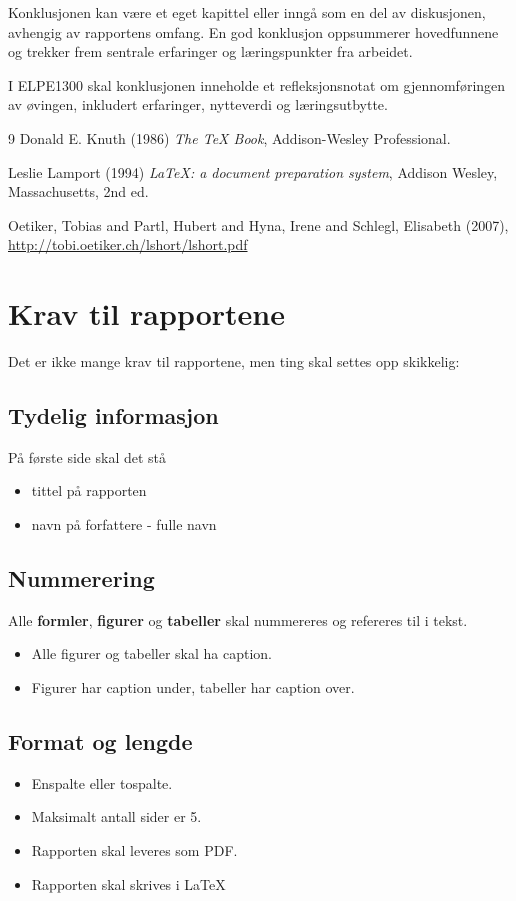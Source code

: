 \documentclass[11pt,a4paper,twocolumn]{article}
\begin{document}
Konklusjonen kan være et eget kapittel eller inngå som en del av diskusjonen, avhengig av rapportens omfang. En god konklusjon oppsummerer hovedfunnene og trekker frem sentrale erfaringer og læringspunkter fra arbeidet.


I ELPE1300 skal konklusjonen inneholde et refleksjonsnotat om gjennomføringen av øvingen, inkludert erfaringer, nytteverdi og læringsutbytte.



\begin{thebibliography}{9}
Donald E. Knuth (1986) \emph{The \TeX{} Book}, Addison-Wesley Professional.

Leslie Lamport (1994) \emph{\LaTeX: a document preparation system}, Addison
Wesley, Massachusetts, 2nd ed.

{Oetiker, Tobias and Partl, Hubert and Hyna, Irene and Schlegl, Elisabeth} (2007), \url{http://tobi.oetiker.ch/lshort/lshort.pdf}

\end{thebibliography}

\newpage
\appendix
\section{Krav til rapportene}\label{app:krav}
Det er ikke mange krav til rapportene, men ting skal settes opp skikkelig:
\subsection{Tydelig informasjon}
På første side skal det stå
  \begin{itemize}
    \item tittel på rapporten
    \item navn på forfattere - fulle navn
  \end{itemize} 
\subsection{Nummerering}
Alle \textbf{formler}, \textbf{figurer} og \textbf{tabeller} skal nummereres og refereres til i tekst.
\begin{itemize}
  \item Alle figurer og tabeller skal ha caption.
  \item Figurer har caption under, tabeller har caption over.
\end{itemize}
\subsection{Format og lengde}
\begin{itemize}
  \item Enspalte eller tospalte.
  \item Maksimalt antall sider er 5.
  \item Rapporten skal leveres som PDF.
  \item Rapporten skal skrives i \LaTeX
\end{itemize} 
\end{document}
